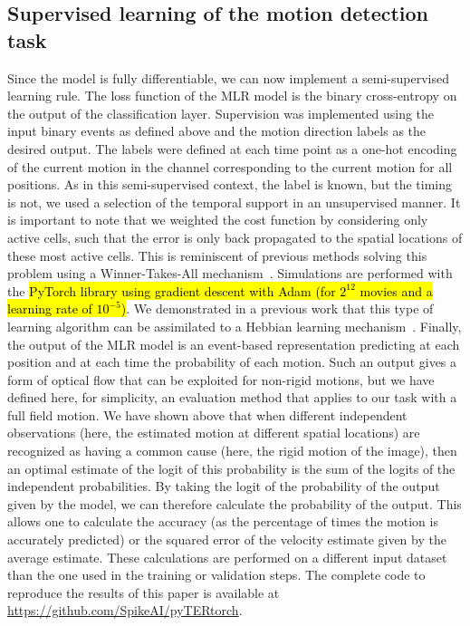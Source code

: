 \documentclass[default]{sn-jnl}%
\theoremstyle{thmstyleone}%
\theoremstyle{thmstyletwo}%
\theoremstyle{thmstylethree}%
\newcommand{\note}[1]{{\sethlcolor{yellow}\hl{#1}}}
\begin{document}
\subsection{Supervised learning of the motion detection task}
%
Since the model is fully differentiable, we can now implement a semi-supervised learning rule. The loss function of the MLR model is the binary cross-entropy on the output of the classification layer. Supervision was implemented using the input binary events as defined above and the motion direction labels as the desired output. The labels were defined at each time point as a one-hot encoding of the current motion in the channel corresponding to the current motion for all positions. As in this semi-supervised context, the label is known, but the timing is not, we used a selection of the temporal support in an unsupervised manner. It is important to note that we weighted the cost function by considering only active cells, such that the error is only back propagated to the spatial locations of these most active cells. This is reminiscent of previous methods solving this problem using a Winner-Takes-All mechanism~\citep{masquelier_unsupervised_2007}. Simulations are performed with the \note{PyTorch library using gradient descent with Adam (for $2^{12}$ movies and a learning rate of $10^{-5}$)}. We demonstrated in a previous work that this type of learning algorithm can be assimilated to a Hebbian learning mechanism~\cite{grimaldi_robust_2022}.  
%
Finally, the output of the MLR model is an event-based representation predicting at each position and at each time the probability of each motion. Such an output gives a form of optical flow that can be exploited for non-rigid motions, but we have defined here, for simplicity, an evaluation method that applies to our task with a full field motion. We have shown above that when different independent observations (here, the estimated motion at different spatial locations) are recognized as having a common cause (here, the rigid motion of the image), then an optimal estimate of the logit of this probability is the sum of the logits of the independent probabilities. By taking the logit of the probability of the output given by the model, we can therefore calculate the probability of the output. This allows one to calculate the accuracy (as the percentage of times the motion is accurately predicted) or the squared error of the velocity estimate given by the average estimate. 
These calculations are performed on a different input dataset than the one used in the training or validation steps. The complete code to reproduce the results of this paper is available at \url{https://github.com/SpikeAI/pyTERtorch}.  %
%
\end{document}

